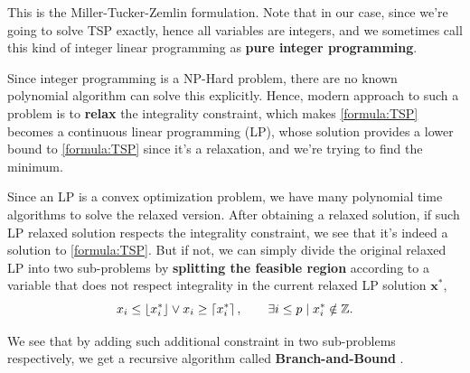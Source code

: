 \documentclass{article}
\begin{document}
This is the Miller-Tucker-Zemlin formulation\cite{MTZ-formulation}. Note that in our case, since we're going to solve TSP exactly, hence all variables are integers,
and we sometimes call this kind of integer linear programming as \textbf{pure integer programming}.

Since integer programming is a NP-Hard problem, there are no known polynomial algorithm can solve this explicitly. Hence, modern approach to such a problem is to
\textbf{relax} the integrality constraint, which makes \autoref{formula:TSP} becomes a continuous linear programming (LP), whose solution provides a lower bound to
\autoref{formula:TSP} since it's a relaxation, and we're trying to find the minimum.

Since an LP is a convex optimization problem, we have many polynomial time algorithms to solve the relaxed version. After obtaining a relaxed solution, if such LP relaxed
solution respects the integrality constraint, we see that it's indeed a solution to \autoref{formula:TSP}. But if not, we can simply divide the original relaxed LP into two
sub-problems by \textbf{splitting the feasible region} according to a variable that does not respect integrality in the current relaxed LP solution \(\bm{x}^\ast\),
\begin{equation}\label{eq:branch-and-bound}
	x_{i} \leq \left\lfloor x_{i}^\ast \right\rfloor\lor x_{i} \geq \left\lceil x_{i}^\ast \right\rceil,\qquad \exists i\leq p\mid x_{i} ^\ast \notin \mathbb{\MakeUppercase{z}}.
\end{equation}

We see that by adding such additional constraint in two sub-problems respectively, we get a recursive algorithm called \textbf{Branch-and-Bound} \cite{B&B.ch7}.
\end{document}
